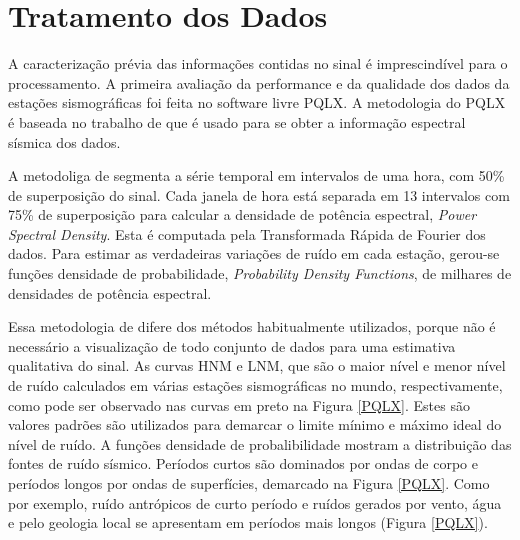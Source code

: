 \section{Tratamento dos Dados}

A caracterização prévia das informações contidas no sinal é imprescindível para o processamento. A primeira avaliação da performance e da qualidade dos dados da estações sismográficas foi feita no software livre PQLX.  A metodologia do PQLX é baseada no trabalho de \cite{McNamara_Buland_2004} que é usado para se obter a informação espectral sísmica dos dados.

A metodoliga de \cite{McNamara_Buland_2004} segmenta a série temporal em intervalos de uma hora, com 50\% de superposição do sinal. Cada janela de hora está separada em 13 intervalos com 75\% de superposição para calcular a densidade de potência espectral, \textit{Power Spectral Density}. Esta é computada pela Transformada Rápida de Fourier dos dados. Para estimar as verdadeiras variações de ruído em cada estação, gerou-se  funções densidade de probabilidade, \textit{Probability Density Functions}, de milhares de densidades de potência espectral.

Essa metodologia de \cite{McNamara_Buland_2004} difere dos métodos habitualmente utilizados, porque não é necessário a visualização de todo conjunto de dados para uma estimativa qualitativa do sinal.  As curvas HNM e LNM, que são o maior nível e menor nível de ruído calculados em várias estações sismográficas no mundo, respectivamente, como pode ser observado nas curvas em preto na Figura \ref{PQLX}. Estes são valores padrões são utilizados para demarcar o limite mínimo e máximo ideal do nível de ruído. A funções densidade de probalibilidade mostram a distribuição das fontes de ruído sísmico. Períodos curtos são dominados por ondas de corpo e períodos longos por ondas de superfícies, demarcado na Figura \ref{PQLX}. Como por exemplo, ruído antrópicos de curto período e ruídos gerados por vento, água e pelo geologia local se apresentam em períodos mais longos (Figura \ref{PQLX}).

